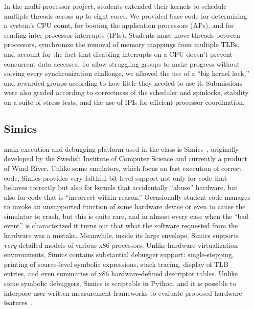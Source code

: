 In the multi-processor project, students extended their kernels to schedule multiple threads across up to eight cores.
We provided base code for determining a system's CPU count, for booting the application processors (APs), and for sending inter-processor interrupts (IPIs).
Students must move threads between processors,
synchronize the removal of memory mappings from multiple TLBs,
and account for the fact that disabling interrupts on a CPU doesn't prevent concurrent data accesses.
To allow struggling groups to make progress without solving every synchronization challenge, we allowed the use of a ``big kernel lock,'' and rewarded groups according to how little they needed to use it.
Submissions were also graded according to
correctness of the scheduler and spinlocks,
stability on a suite of stress tests,
and the use of IPIs for efficient processor coordination.

\subsection{Simics}

 main execution and debugging
platform used in the class is
Simics~\cite{simics},
originally developed by the Swedish Institute of
Computer Science and
currently a product of Wind River.
Unlike some emulators,
which focus on fast execution of correct code,
Simics
provides very faithful bit-level support
not only for code that behaves correctly
\shortversion
{but also for kernels that accidentally ``abuse'' hardware.}
{but also for code that is ``incorrect within reason.''
Occasionally student code manages to invoke an unsupported
function of some hardware device or even to cause the
simulator to crash, but this is quite rare, and in almost
every case when the ``bad event'' is characterized it turns
out that what the software requested from the hardware was
a mistake.
Meanwhile, inside its large envelope, Simics supports
\textit{very} detailed models of various x86 processors.}
Unlike hardware virtualization environments,
Simics contains substantial debugger support:
single-stepping,
printing of source-level symbolic
expressions,
stack tracing,
display of TLB entries,
and even summaries of x86 hardware-defined descriptor tables.
Unlike some symbolic debuggers,
Simics is scriptable in Python,
and it is possible to interpose user-written measurement
frameworks to evaluate proposed hardware
features~.

